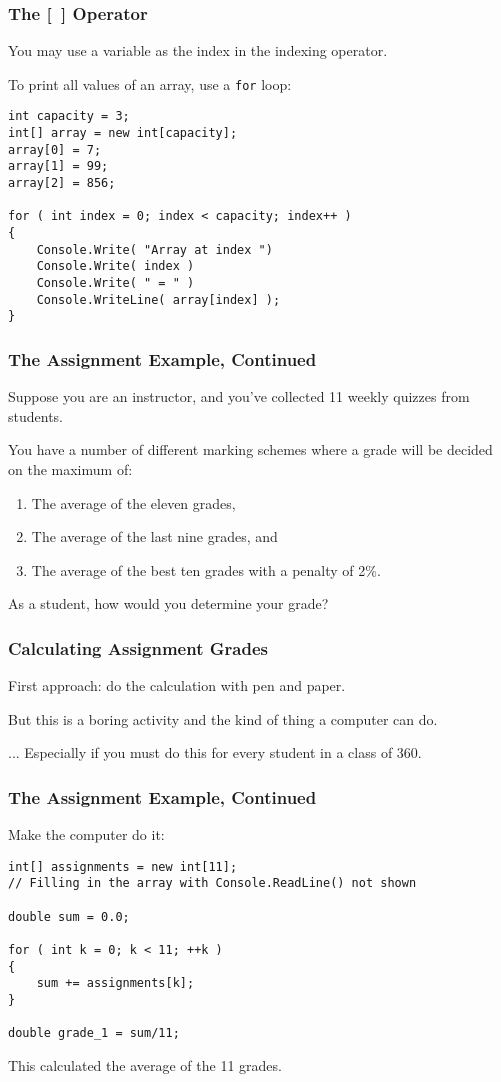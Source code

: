 \begin{frame}[fragile]
\frametitle{The [~] Operator}

You may use a variable as the index in the indexing operator.

To print all values of an array, use a \texttt{for} loop:

\begin{verbatim}
int capacity = 3;
int[] array = new int[capacity];
array[0] = 7;
array[1] = 99;
array[2] = 856;

for ( int index = 0; index < capacity; index++ )
{
    Console.Write( "Array at index ")
    Console.Write( index )
    Console.Write( " = " )
    Console.WriteLine( array[index] );
}
\end{verbatim}

\end{frame}

\begin{frame}
\frametitle{The Assignment Example, Continued}

Suppose you are an instructor, and you've collected 11 weekly quizzes from students.

You have a number of different marking schemes where a grade will be decided on the maximum of:
\begin{enumerate}
\item The average of the eleven grades,
\item The average of the last nine grades, and
\item The average of the best ten grades with a penalty of 2\%.
\end{enumerate}

As a student, how would you determine your grade? 

\end{frame}

\begin{frame}
\frametitle{Calculating Assignment Grades}
First approach: do the calculation with pen and paper.

But this is a boring activity and the kind of thing a computer can do.

... Especially if you must do this for every student in a class of 360.

\end{frame}

\begin{frame}[fragile]
\frametitle{The Assignment Example, Continued}
Make the computer do it:
\begin{verbatim}
int[] assignments = new int[11];
// Filling in the array with Console.ReadLine() not shown

double sum = 0.0;

for ( int k = 0; k < 11; ++k )
{
    sum += assignments[k];
}

double grade_1 = sum/11;
\end{verbatim}

This calculated the average of the 11 grades.

\end{frame}

